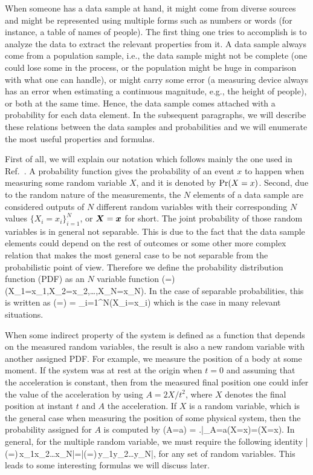 When someone has a data sample at hand, it might come from diverse sources and might be represented using multiple forms such as numbers or words (for instance, a table of names of people).
The first thing one tries to accomplish is to analyze the data to extract the relevant properties from it.
A data sample always come from a population sample, i.e., the data sample might not be complete (one could lose some in the process, or the population might be huge in comparison with what one can handle), or might carry some error (a measuring device always has an error when estimating a continuous magnitude, e.g., the height of people), or both at the same time.
Hence, the data sample comes attached with a probability for each data element.
In the subsequent paragraphs, we will describe these relations between the data samples and probabilities and we will enumerate the most useful properties and formulas.

First of all, we will explain our notation which follows mainly the one used in Ref.~\cite{Riley2006}.
A probability function gives the probability of an event $x$ to happen when measuring some random variable $X$, and it is denoted by $\text{Pr}(X=x)$.
Second, due to the random nature of the measurements, the $N$ elements of a data sample are considered outputs of $N$ different random variables with their corresponding $N$ values $\{X_i=x_i\}_{i=1}^N$, or $\boldsymbol{X}=\boldsymbol{x}$ for short.
The joint probability of those random variables is in general not separable.
This is due to the fact that the data sample elements could depend on the rest of outcomes or some other more complex relation that makes the most general case to be not separable from the probabilistic point of view.
Therefore we define the probability distribution function (PDF) as an $N$ variable function
\be
  \prob(=) \equiv \prob(X_1=x_1,X_2=x_2,\dots,X_N=x_N).
\ee
In the case of separable probabilities, this is written as
\be
  \label{eq:bg-separable-likelyhood}
  \prob(=) = \prod_{i=1}^N\prob(X_i=x_i)
\ee
which is the case in many relevant situations.

When some indirect property of the system is defined as a function that depends on the measured random variables, the result is also a new random variable with another assigned PDF.
For example, we measure the position of a body at some moment.
If the system was at rest at the origin when $t=0$ and assuming that the acceleration is constant, then from the measured final position one could infer the value of the acceleration by using $A=2X/t^2$, where $X$ denotes the final position at instant $t$ and $A$ the acceleration.
If $X$ is a random variable, which is the general case when measuring the position of some physical system, then the probability assigned for $A$ is computed by
\be
  \prob(A=a) = \left.\right|_{A=a}\prob(X=x)=\prob(X=x).
\ee
In general, for the multiple random variable, we must require the following identity
\be
  |\prob(=)\,x_1x_2\dots{}x_N|=|\prob(=)\,y_1y_2\dots{}y_N|,
\ee
for any set of random variables.
This leads to some interesting formulas we will discuss later.

